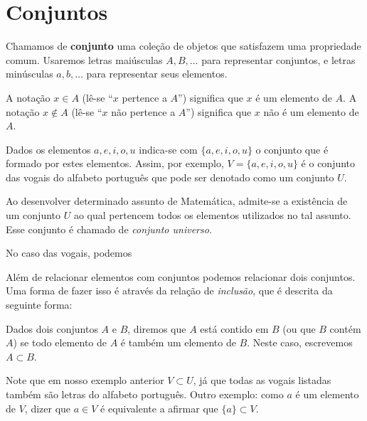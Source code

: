 
\chapter{Conjuntos}


Chamamos de \textbf{conjunto} uma coleção de objetos que satisfazem uma propriedade comum. Usaremos letras maiúsculas $A, B, \ldots$ para representar  conjuntos, e letras minúsculas $a, b, \ldots$ para representar seus elementos.

\begin{obs}
A notação $x \in A$ (lê-se ``$x$ pertence a $A$'') significa que $x$ é um elemento de $A$. A notação $x \notin A$ (lê-se ``$x$ não pertence a $A$'') significa que $x$ não é um elemento de $A$.
\end{obs}

Dados os elementos $a, e, i, o, u$ indica-se com $\{a, e, i, o, u\}$ o conjunto que é formado por estes elementos. Assim, por exemplo, $V= \{a, e, i, o, u\}$ é o conjunto das vogais do alfabeto português que pode ser denotado como um conjunto $U$.

\begin{obs}
Ao desenvolver determinado assunto de Matemática, admite-se a existência de um conjunto $U$ ao qual pertencem todos os elementos utilizados no tal assunto. Esse conjunto é chamado de \emph{conjunto universo}.
\end{obs}

No caso das vogais, podemos 

Além de relacionar elementos com conjuntos podemos relacionar dois conjuntos. Uma forma de fazer isso é através da relação de \textit{inclusão}, que é descrita da seguinte forma:

\begin{obs}
Dados dois conjuntos $A$ e $B$, diremos que $A$ está contido em $B$ (ou que $B$ contém $A$) se todo elemento de $A$ é também um elemento de $B$. Neste caso, escrevemos $A \subset B$.
\end{obs}

Note que em nosso exemplo anterior $V \subset U$, já que todas as vogais listadas também são letras do alfabeto português. Outro exemplo: como $a$ é um elemento de $V$, dizer que $a \in V$ é equivalente a afirmar que $\{a\} \subset V$.


